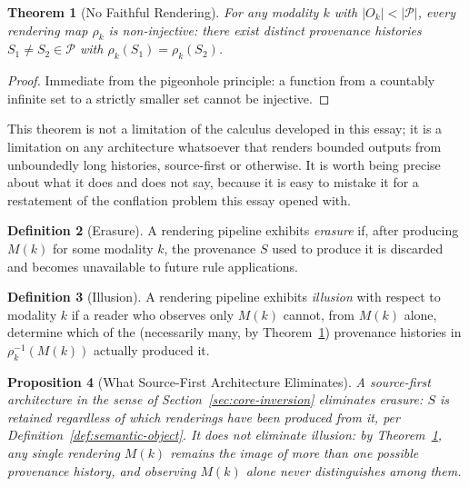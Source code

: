 \documentclass[11pt]{article}
\newtheorem{theorem}{Theorem}[section]
\newtheorem{proposition}[theorem]{Proposition}
\theoremstyle{definition}
\newtheorem{definition}[theorem]{Definition}
\begin{document}
\begin{theorem}[No Faithful Rendering]
\label{thm:no-faithful-rendering}
For any modality $k$ with $|O_k| < |\mathcal{P}|$, every rendering map $\rho_k$ is non-injective: there exist distinct provenance histories $S_1 \neq S_2 \in \mathcal{P}$ with $\rho_k(S_1) = \rho_k(S_2)$.
\end{theorem}

\begin{proof}
Immediate from the pigeonhole principle: a function from a countably infinite set to a strictly smaller set cannot be injective.
\end{proof}

This theorem is not a limitation of the calculus developed in this essay; it is a limitation on any architecture whatsoever that renders bounded outputs from unboundedly long histories, source-first or otherwise. It is worth being precise about what it does and does not say, because it is easy to mistake it for a restatement of the conflation problem this essay opened with.

\begin{definition}[Erasure]
\label{def:erasure}
A rendering pipeline exhibits \emph{erasure} if, after producing $M(k)$ for some modality $k$, the provenance $S$ used to produce it is discarded and becomes unavailable to future rule applications.
\end{definition}

\begin{definition}[Illusion]
\label{def:illusion}
A rendering pipeline exhibits \emph{illusion} with respect to modality $k$ if a reader who observes only $M(k)$ cannot, from $M(k)$ alone, determine which of the (necessarily many, by Theorem~\ref{thm:no-faithful-rendering}) provenance histories in $\rho_k^{-1}(M(k))$ actually produced it.
\end{definition}

\begin{proposition}[What Source-First Architecture Eliminates]
\label{prop:eliminates}
A source-first architecture in the sense of Section~\ref{sec:core-inversion} eliminates erasure: $S$ is retained regardless of which renderings have been produced from it, per Definition~\ref{def:semantic-object}. It does not eliminate illusion: by Theorem~\ref{thm:no-faithful-rendering}, any single rendering $M(k)$ remains the image of more than one possible provenance history, and observing $M(k)$ alone never distinguishes among them.
\end{proposition}
\end{document}
